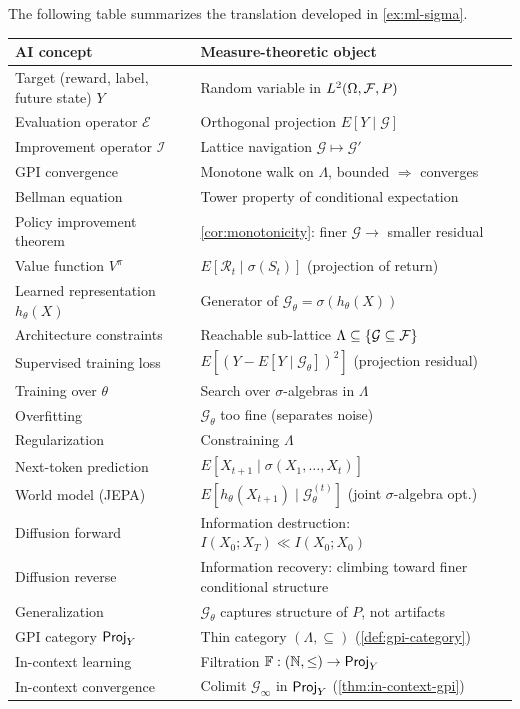\begin{remark}\label{rmk:ml-dictionary}
The following table summarizes the translation developed in \cref{ex:ml-sigma}.

\medskip
\begin{center}
\renewcommand{\arraystretch}{1.25}
\small
\begin{tabular}{@{}p{}p{}@{}}
\hline
\textbf{AI concept} & \textbf{Measure-theoretic object} \\
\hline
Target (reward, label, future state) $Y$ & Random variable in $L^2(\Omega, \mathcal{F}, P)$ \\
Evaluation operator $\mathcal{E}$ & Orthogonal projection $E[Y \mid \mathcal{G}]$ \\
Improvement operator $\mathcal{I}$ & Lattice navigation $\mathcal{G} \mapsto \mathcal{G}'$ \\
GPI convergence & Monotone walk on $\Lambda$, bounded $\Rightarrow$ converges \\
Bellman equation & Tower property of conditional expectation \\
Policy improvement theorem & \cref{cor:monotonicity}: finer $\mathcal{G} \to$ smaller residual \\
Value function $V^\pi$ & $E[\mathcal{R}_t \mid \sigma(S_t)]$ (projection of return) \\
\hline
Learned representation $h_\theta(X)$ & Generator of $\mathcal{G}_\theta = \sigma(h_\theta(X))$ \\
Architecture constraints & Reachable sub-lattice $\Lambda \subseteq \{\mathcal{G} \subseteq \mathcal{F}\}$ \\
Supervised training loss & $E[(Y - E[Y \mid \mathcal{G}_\theta])^2]$ (projection residual) \\
Training over $\theta$ & Search over $\sigma$-algebras in $\Lambda$ \\
Overfitting & $\mathcal{G}_\theta$ too fine (separates noise) \\
Regularization & Constraining $\Lambda$ \\
\hline
Next-token prediction & $E[X_{t+1} \mid \sigma(X_1, \ldots, X_t)]$ \\
World model (JEPA) & $E[h_\theta(X_{t+1}) \mid \mathcal{G}_\theta^{(t)}]$ (joint $\sigma$-algebra opt.) \\
Diffusion forward & Information destruction: $I(X_0; X_T) \ll I(X_0; X_0)$ \\
Diffusion reverse & Information recovery: climbing toward finer conditional structure \\
Generalization & $\mathcal{G}_\theta$ captures structure of $P$, not artifacts \\
\hline
GPI category $\mathsf{Proj}_Y$ & Thin category $(\Lambda, \subseteq)$ (\cref{def:gpi-category}) \\
In-context learning & Filtration $\mathbb{F} : (\mathbb{N}, \leq) \to \mathsf{Proj}_Y$ \\
In-context convergence & Colimit $\mathcal{G}_\infty$ in $\mathsf{Proj}_Y$ (\cref{thm:in-context-gpi}) \\
\hline
\end{tabular}
\normalsize
\end{center}
\medskip


\end{remark}
